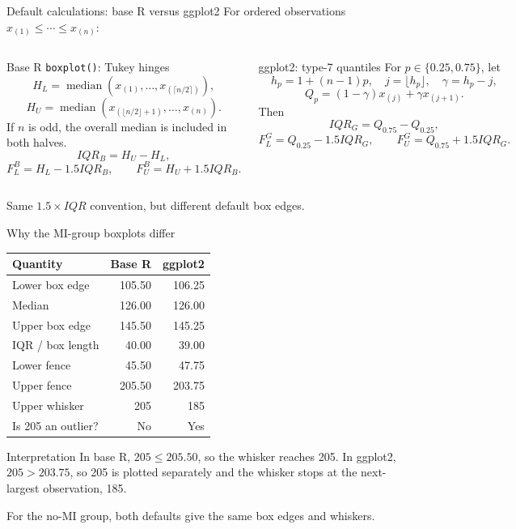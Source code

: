 \documentclass[aspectratio=169,11pt]{beamer}
\begin{document}
\begin{frame}{Default calculations: base R versus ggplot2}
  \scriptsize
  For ordered observations \(x_{(1)}\leq\cdots\leq x_{(n)}\):
  \begin{columns}[T,onlytextwidth]
      \begin{block}{Base R \texttt{boxplot()}: Tukey hinges}
        \[
          H_L=\operatorname{median}
          \left(x_{(1)},\ldots,x_{(\lceil n/2\rceil)}\right),
        \]
        \[
          H_U=\operatorname{median}
          \left(x_{(\lfloor n/2\rfloor+1)},\ldots,x_{(n)}\right).
        \]
        If \(n\) is odd, the overall median is included in both halves.
        \[
          IQR_B=H_U-H_L,
        \]
        \[
          F_L^{B}=H_L-1.5IQR_B,
          \qquad
          F_U^{B}=H_U+1.5IQR_B.
        \]
      \end{block}
      \begin{block}{ggplot2: type-7 quantiles}
        For \(p\in\{0.25,0.75\}\), let
        \[
          h_p=1+(n-1)p,\quad j=\lfloor h_p\rfloor,
          \quad \gamma=h_p-j,
        \]
        \[
          Q_p=(1-\gamma)x_{(j)}+\gamma x_{(j+1)}.
        \]
        Then
        \[
          IQR_G=Q_{0.75}-Q_{0.25},
        \]
        \[
          F_L^{G}=Q_{0.25}-1.5IQR_G,
          \qquad
          F_U^{G}=Q_{0.75}+1.5IQR_G.
        \]
      \end{block}
  \end{columns}
  \vspace{0.2em}
  \alert{Same \(1.5\times IQR\) convention, but different default box edges.}
\end{frame}

\begin{frame}{Why the MI-group boxplots differ}
  \small
  \begin{center}
    \begin{tabular}{lrr}
      \toprule
      \textbf{Quantity} & \textbf{Base R} & \textbf{ggplot2} \\
      \midrule
      Lower box edge & 105.50 & 106.25 \\
      Median & 126.00 & 126.00 \\
      Upper box edge & 145.50 & 145.25 \\
      IQR / box length & 40.00 & 39.00 \\
      Lower fence & 45.50 & 47.75 \\
      Upper fence & 205.50 & 203.75 \\
      Upper whisker & 205 & 185 \\
      Is 205 an outlier? & No & Yes \\
      \bottomrule
    \end{tabular}
  \end{center}
  \begin{alertblock}{Interpretation}
    In base R, \(205\leq205.50\), so the whisker reaches 205.
    In ggplot2, \(205>203.75\), so 205 is plotted separately and the whisker
    stops at the next-largest observation, 185.
  \end{alertblock}
  \vfill
  For the no-MI group, both defaults give the same box edges and whiskers.
\end{frame}
\end{document}

